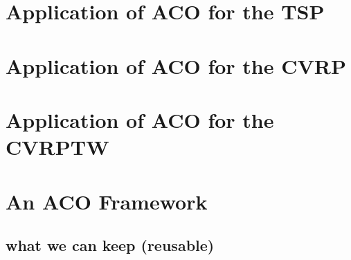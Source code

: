 \section{Application of ACO for the TSP}
\section{Application of ACO for the CVRP}
\section{Application of ACO for the CVRPTW}
\section{An ACO Framework}\label{framework}
\subsection{what we can keep (reusable)}